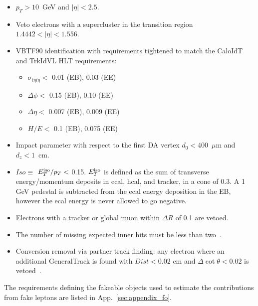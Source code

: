 \begin{itemize}

\item $p_{T}>10$~GeV and $|\eta| < 2.5$.

\item Veto electrons with a supercluster in the transition region $1.4442 < |\eta| < 1.556$.

\item VBTF90 identification\cite{ref:vbtf} with requirements tightened to match the CaloIdT and TrkIdVL HLT requirements:

  \begin{itemize}
  \item $\sigma_{i\eta i\eta} < $ 0.01 (EB), 0.03 (EE)
  \item $\Delta\phi < $ 0.15 (EB), 0.10 (EE)
  \item $\Delta\eta < $ 0.007 (EB), 0.009 (EE)
  \item $H/E < $ 0.1 (EB), 0.075 (EE)
  \end{itemize}  

\item Impact parameter with respect to the first DA vertex $d_0 < 400$~$\mu$m and $d_z < 1$~cm.

\item $Iso \equiv $ $E_T^{\rm iso}/p_T < $ 0.15.  $E_T^{\rm iso}$
is defined as the sum of transverse energy/momentum deposits in ecal,
hcal, and tracker, in a 
cone of 0.3.  A 1 GeV pedestal is subtracted from the ecal energy 
deposition in the EB, however the ecal energy is never allowed to 
go negative.

\item Electrons with a tracker or global muon within $\Delta R$ of 
0.1 are vetoed.

\item The number of missing expected inner hits must be less than 
two~\cite{ref:conv}.

\item Conversion removal via partner track finding: any electron
where an additional GeneralTrack is found with $Dist < 0.02$ cm 
and $\Delta \cot \theta < 0.02$ is vetoed~\cite{ref:conv}.


\end{itemize}

The requirements defining the fakeable objects used to estimate the
contributions from fake leptons are listed in App.~\ref{sec:appendix_fo}.


